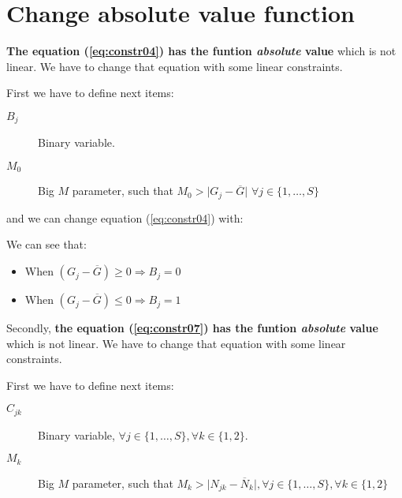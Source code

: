 \documentclass[a4paper,12pt]{article}
\begin{document}


\section{Change absolute value function}\label{sec:absolute}

\textbf{The equation (\ref{eq:constr04}) has the funtion \textit{absolute} value} which is not linear. We have to change that equation with some linear constraints.

First we have to define next items:
\begin{description}
	\item[$B_j$] Binary variable.
	\item[$M_0$] Big $M$ parameter, such that $M_0 > \lvert G_j - \overline{G} \rvert$  $\forall j \in \{1, \ldots, S\}$
\end{description}

and we can change equation (\ref{eq:constr04}) with:
\begin{lpformulation}
\end{lpformulation}
We can see that:
\begin{itemize}
	\item When $(G_j - \overline{G}) \ge 0 \Longrightarrow B_j = 0$
	\item When $(G_j - \overline{G}) \le 0 \Longrightarrow B_j = 1$
\end{itemize}


Secondly, \textbf{the equation (\ref{eq:constr07}) has the funtion \textit{absolute} value} which is not linear. We have to change that equation with some linear constraints.

First we have to define next items:
\begin{description}
	\item[$C_{jk}$] Binary variable, $\forall j \in \{1, \ldots, S\}, \forall k \in \{1, 2\}$.
	\item[$M_k$] Big $M$ parameter, such that $M_k > \lvert N_{jk} - \overline{N}_k \rvert, \forall j \in \{1, \ldots, S\}, \forall k \in \{1, 2\}$
\end{description}
\end{document}
